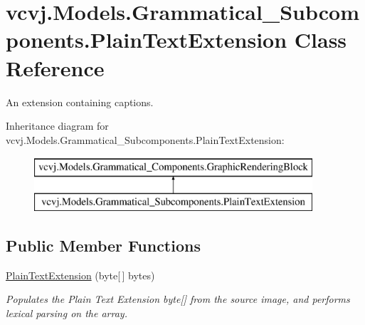 \hypertarget{classvcvj_1_1_models_1_1_grammatical___subcomponents_1_1_plain_text_extension}{}\section{vcvj.\+Models.\+Grammatical\+\_\+\+Subcomponents.\+Plain\+Text\+Extension Class Reference}
\label{classvcvj_1_1_models_1_1_grammatical___subcomponents_1_1_plain_text_extension}


An extension containing captions.  


Inheritance diagram for vcvj.\+Models.\+Grammatical\+\_\+\+Subcomponents.\+Plain\+Text\+Extension\+:\begin{figure}[H]
\begin{center}
\leavevmode
\includegraphics[height=2.000000cm]{classvcvj_1_1_models_1_1_grammatical___subcomponents_1_1_plain_text_extension}
\end{center}
\end{figure}
\subsection*{Public Member Functions}
\begin{DoxyCompactItemize}
\item 
\hyperlink{classvcvj_1_1_models_1_1_grammatical___subcomponents_1_1_plain_text_extension_a9c11305040871f3d087375996b158e50}{Plain\+Text\+Extension} (byte\mbox{[}$\,$\mbox{]} bytes)
\begin{DoxyCompactList}\small\item\em Populates the Plain Text Extension byte\mbox{[}\mbox{]} from the source image, and performs lexical parsing on the array. \end{DoxyCompactList}\end{DoxyCompactItemize}
